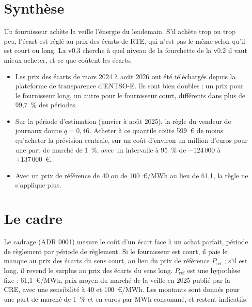 \documentclass[11pt,a4paper]{article}
\begin{document}

\setcounter{tocdepth}{1}
\tableofcontents
\newpage

\section*{Synthèse}

Un fournisseur achète la veille l'énergie du lendemain. S'il achète trop ou trop peu, l'écart est réglé au prix des écarts de RTE, qui n'est pas le même selon qu'il est court ou long. La v0.3 cherche à quel niveau de la fourchette de la v0.2 il vaut mieux acheter, et ce que coûtent les écarts.

\begin{itemize}
  \item Les prix des écarts de mars 2024 à août 2026 ont été téléchargés depuis la plateforme de transparence d'ENTSO-E. Ils sont bien doubles : un prix pour le fournisseur long, un autre pour le fournisseur court, différents dans plus de 99,7~\% des périodes.
  \item Sur la période d'estimation (janvier à août 2025), la règle du vendeur de journaux donne $q = 0{,}46$. Acheter à ce quantile coûte 599~€ de moins qu'acheter la prévision centrale, sur un coût d'environ un million d'euros pour une part de marché de 1~\%, avec un intervalle à 95~\% de $-124\,000$ à $+137\,000$~€.
  \item Avec un prix de référence de 40 ou de 100~€/MWh au lieu de 61,1, la règle ne s'applique plus.
\end{itemize}


\section{Le cadre}

Le cadrage (ADR 0001) mesure le coût d'un écart face à un achat parfait, période de règlement par période de règlement. Si le fournisseur est court, il paie le manque au prix des écarts du sens court, au lieu du prix de référence $P_{\text{ref}}$ ; s'il est long, il revend le surplus au prix des écarts du sens long. $P_{\text{ref}}$ est une hypothèse fixe : 61,1~€/MWh, prix moyen du marché de la veille en 2025 publié par la CRE, avec une sensibilité à 40 et 100~€/MWh. Les montants sont donnés pour une part de marché de 1~\% et en euros par MWh consommé, et restent indicatifs.
\end{document}
